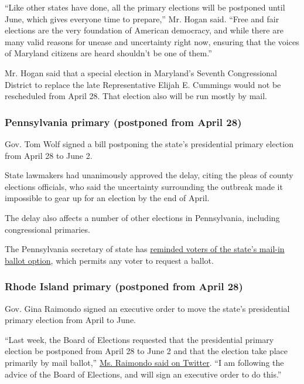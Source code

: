``Like other states have done, all the primary elections will be
postponed until June, which gives everyone time to prepare,'' Mr. Hogan
said. ``Free and fair elections are the very foundation of American
democracy, and while there are many valid reasons for unease and
uncertainty right now, ensuring that the voices of Maryland citizens are
heard shouldn't be one of them.''

Mr. Hogan said that a special election in Maryland's Seventh
Congressional District to replace the late Representative Elijah E.
Cummings would not be rescheduled from April 28. That election also will
be run mostly by mail.

\hypertarget{pennsylvania-primary-postponed-from-april-28}{%
\subsubsection{Pennsylvania primary (postponed from April
28)}\label{pennsylvania-primary-postponed-from-april-28}}

Gov. Tom Wolf signed a bill postponing the state's presidential primary
election from April 28 to June 2.

State lawmakers had unanimously approved the delay, citing the pleas of
county elections officials, who said the uncertainty surrounding the
outbreak made it impossible to gear up for an election by the end of
April.

The delay also affects a number of other elections in Pennsylvania,
including congressional primaries.

The Pennsylvania secretary of state has
\href{https://www.media.pa.gov/Pages/State-Details.aspx?newsid=374}{reminded
voters of the state's mail-in ballot option}, which permits any voter to
request a ballot.

\hypertarget{rhode-island-primary-postponed-from-april-28}{%
\subsubsection{Rhode Island primary (postponed from April
28)}\label{rhode-island-primary-postponed-from-april-28}}

Gov. Gina Raimondo signed an executive order to move the state's
presidential primary election from April to June.

``Last week, the Board of Elections requested that the presidential
primary election be postponed from April 28 to June 2 and that the
election take place primarily by mail ballot,''
\href{https://twitter.com/GovRaimondo/status/1242146911945216009}{Ms.
Raimondo said on Twitter}. ``I am following the advice of the Board of
Elections, and will sign an executive order to do this.''

